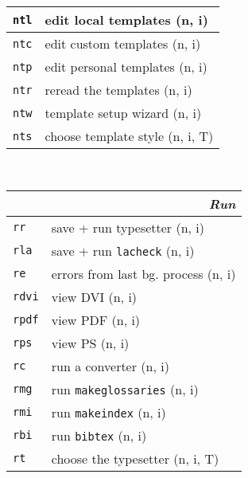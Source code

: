 \documentclass[oneside,10pt,landscape,DIV16]{scrartcl}
\newcommand{\Map}[1] {\textbf{\textasciiacute}\texttt{#1}}
\begin{document}
\begin{multicols}{3}
\begin{center}
\begin{tabular}[]{|p{11mm}|p{60mm}|}
\hline
\hline \Map{ntl} & edit local templates      \hfill (n, i)   \\
\hline \Map{ntc} & edit custom templates     \hfill (n, i)   \\
\hline \Map{ntp} & edit personal templates   \hfill (n, i)   \\
\hline \Map{ntr} & reread the templates      \hfill (n, i)   \\
\hline \Map{ntw} & template setup wizard     \hfill (n, i)   \\
\hline \Map{nts} & choose template style     \hfill (n, i, T)\\
\hline
%
\end{tabular}\\
%
\begin{tabular}[]{|p{11mm}|p{62mm}|}
\hline
\multicolumn{2}{|r|}{\textsl{\textbf{R}un}} \\[1.0ex]
\hline \Map{rr}   & save + run typesetter                    \hfill (n, i)\\
\hline \Map{rla}  & save + run \texttt{lacheck}              \hfill (n, i)\\
\hline \Map{re}   & errors from last bg. process             \hfill (n, i)\\
\hline \Map{rdvi} & view DVI                                 \hfill (n, i)\\
\hline \Map{rpdf} & view PDF                                 \hfill (n, i)\\
\hline \Map{rps}  & view PS                                  \hfill (n, i)\\
\hline \Map{rc}   & run a converter                          \hfill (n, i)\\
\hline
\hline \Map{rmg}  & run \texttt{makeglossaries}              \hfill (n, i)\\
\hline \Map{rmi}  & run \texttt{makeindex}                   \hfill (n, i)\\
\hline \Map{rbi}  & run \texttt{bibtex}                      \hfill (n, i)\\
\hline
\hline \Map{rt}   & choose the typesetter                    \hfill (n, i, T)\\

\end{tabular}
\end{center}
\end{multicols}
\end{document}
